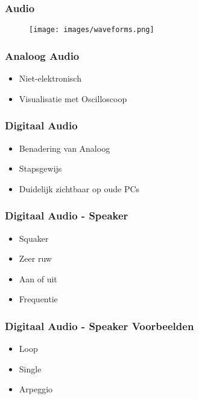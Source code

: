 \begin{frame}
\frametitle{Audio}

\begin{figure}
\texttt{[image: images/waveforms.png]}
\end{figure}

\end{frame}


\begin{frame}
\frametitle{Analoog Audio}

\begin{itemize}
\item Niet-elektronisch
\item Visualisatie met Oscilloscoop
\end{itemize}

\end{frame}


\begin{frame}
\frametitle{Digitaal Audio}

\begin{itemize}
\item Benadering van Analoog
\item Stapsgewijs
\item Duidelijk zichtbaar op oude PCs
\end{itemize}

\end{frame}


\begin{frame}
\frametitle{Digitaal Audio - Speaker}

\begin{itemize}
\item Squaker
\item Zeer ruw
\item Aan of uit
\item Frequentie
\end{itemize}

\end{frame}


\begin{frame}
\frametitle{Digitaal Audio - Speaker Voorbeelden}

\begin{itemize}
\item Loop
\item Single
\item Arpeggio
\end{itemize}

\end{frame}


